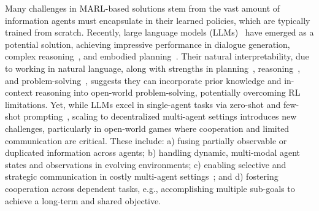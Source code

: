 
Many challenges in MARL-based solutions stem from the vast amount of information agents must encapsulate in their learned policies, which are typically trained from scratch. Recently, large language models (LLMs)~\cite{brown2020language} have emerged as a potential solution, achieving impressive performance in dialogue generation, complex reasoning~\cite{liang2022holistic, achiam2023gpt, touvron2023llama,warner2023utilizing}, and embodied planning~\cite{ahn2022can, du2023improving, wang2023voyager}. Their natural interpretability, due to working in natural language, along with strengths in planning~\cite{ahn2022can}, reasoning~\cite{shinn2024reflexion}, and problem-solving~\cite{bubeck2023sparks}, suggests they can incorporate prior knowledge and in-context reasoning into open-world problem-solving, potentially overcoming RL limitations. Yet, while LLMs excel in single-agent tasks via zero-shot and few-shot prompting~\cite{huang2022language, song2023llm}, scaling to decentralized multi-agent settings introduces new challenges, particularly in open-world games where cooperation and limited communication are critical. These include: a) fusing partially observable or duplicated information across agents; b) handling dynamic, multi-modal agent states and observations in evolving environments; c) enabling selective and strategic communication in costly multi-agent settings~\cite{guo2024large, zhang2023building}; and d) fostering cooperation across dependent tasks, e.g., accomplishing multiple sub-goals to achieve a long-term and shared objective.

